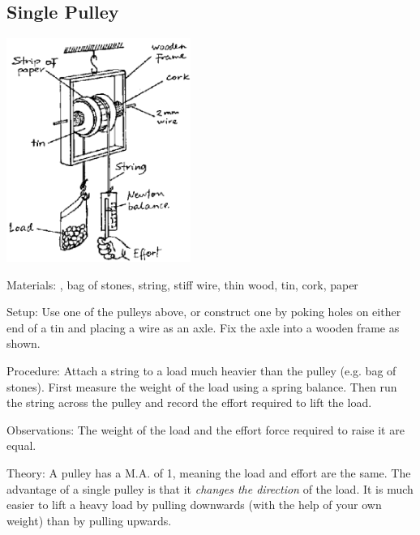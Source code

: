 \begin{multicols}{2}
\subsection{Single Pulley}

\begin{center}
\includegraphics[width=0.45\textwidth]{./img/source/single-pulley.png}
\end{center}

\begin{description*}
\item[Materials:]{, bag of stones, string, stiff wire, thin wood, tin, cork, paper}
\item[Setup:]{Use one of the pulleys above, or construct one by poking holes on either end of a tin and placing a wire as an axle. Fix the axle into a wooden frame as shown.}
\item[Procedure:]{Attach a string to a load much heavier than the pulley (e.g. bag of stones). First measure the weight of the load using a spring balance. Then run the string across the pulley and record the effort required to lift the load.}
\item[Observations:]{The weight of the load and the effort force required to raise it are equal.}
\item[Theory:]{A pulley has a M.A. of 1, meaning the load and effort are the same. The advantage of a single pulley is that it \emph{changes the direction} of the load. It is much easier to lift a heavy load by pulling downwards (with the help of your own weight) than by pulling upwards.}
\end{description*}


\end{multicols}

